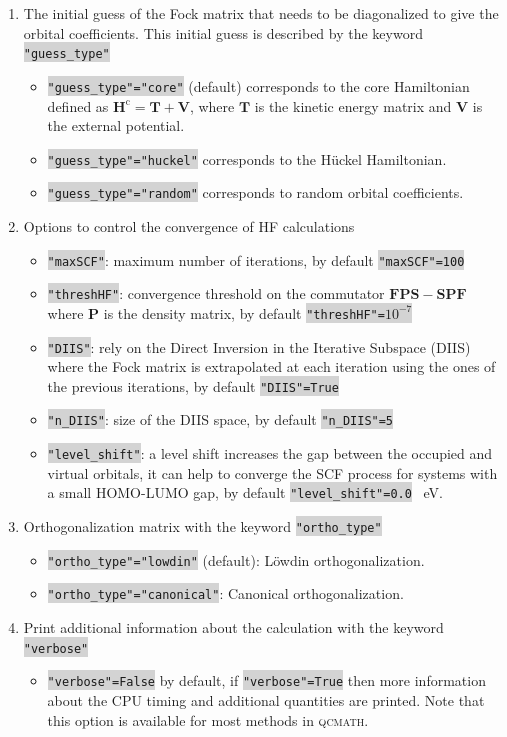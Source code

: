 \documentclass[aip,jcp,reprint,noshowkeys,superscriptaddress]{revtex4-1}
\newcommand{\HcMat}{\bm{H}^\text{c}}
\newcommand{\TMat}{\bm{T}}
\newcommand{\VMat}{\bm{V}}
\newcommand{\qcmath}{\textsc{qcmath}\xspace}
\newcommand{\keyword}[1]{{\colorbox{lightgray}{\texttt{#1}}}}
\begin{document}
\begin{enumerate}
	\item The initial guess of the Fock matrix that needs to be diagonalized to give the orbital coefficients. This initial guess is described by the keyword \keyword{"guess\_type"}
    \begin{itemize}
    	\item \keyword{"guess\_type"="core"} (default) corresponds to the core Hamiltonian defined as $\HcMat = \TMat + \VMat$, where $\TMat$ is the kinetic energy matrix and $\VMat$ is the external potential.
    	\item \keyword{"guess\_type"="huckel"}  corresponds to the H\"uckel Hamiltonian.
    	\item \keyword{"guess\_type"="random"}  corresponds to random orbital coefficients.
    \end{itemize}
	\item Options to control the convergence of HF calculations
    \begin{itemize}
	    \item \keyword{"maxSCF"}: maximum number of iterations, by default \keyword{"maxSCF"=100}
		\item \keyword{"threshHF"}: convergence threshold on the commutator $\mathbf{F} \mathbf{P} \mathbf{S} - \mathbf{S} \mathbf{P} \mathbf{F}$ where $\mathbf{P}$ is the density matrix, by default \keyword{"threshHF"=$10^{-7}$}
    	\item \keyword{"DIIS"}: rely on the Direct Inversion in the Iterative Subspace (DIIS) where the Fock matrix is extrapolated at each iteration using the ones of the previous iterations, by default \keyword{"DIIS"=True}
    	\item \keyword{"n\_DIIS"}: size of the DIIS space, by default \keyword{"n\_DIIS"=5}
    	\item \keyword{"level\_shift"}: a level shift increases the gap between the occupied and virtual orbitals, it can help to converge the SCF process for systems with a small HOMO-LUMO gap, by default \keyword{"level\_shift"=0.0} \SI{}{eV}.
    \end{itemize}
	\item Orthogonalization matrix with the keyword \keyword{"ortho\_type"}
    \begin{itemize}
		\item \keyword{"ortho\_type"="lowdin"} (default): L\"owdin orthogonalization.
	    \item \keyword{"ortho\_type"="canonical"}: Canonical orthogonalization. 
    \end{itemize}
	\item Print additional information about the calculation with the keyword \keyword{"verbose"}
	\begin{itemize}
		\item \keyword{"verbose"=False} by default, if \keyword{"verbose"=True} then more information about the CPU timing and additional quantities are printed. Note that this option is available for most methods in \qcmath.
	\end{itemize}
\end{enumerate}
\end{document}
